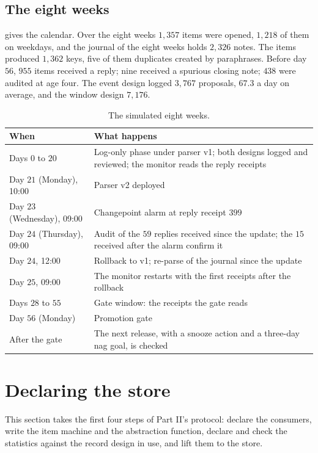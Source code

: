 \documentclass[11pt]{article}
\theoremstyle{definition}
\theoremstyle{plain}
\begin{document}
\subsection{The eight weeks}\label{sec:weeks}

 gives the calendar. Over the eight weeks $1{,}357$ items were opened, $1{,}218$
of them on weekdays, and the journal of the eight weeks holds $2{,}326$ notes. The items produced
$1{,}362$ keys, five of them duplicates created by paraphrases. Before day~$56$, $955$ items received
a reply; nine received a spurious closing note; $438$ were audited at age four. The event design
logged $3{,}767$ proposals, $67.3$ a day on average, and the window design $7{,}176$.

\begin{table}[ht]
\centering\small
\begin{tabularx}{\textwidth}{>{\raggedright\arraybackslash}p{3.4cm}X}
\toprule
When & What happens\\
\midrule
Days $0$ to $20$ & Log-only phase under parser v1; both designs logged and reviewed; the
monitor reads the reply receipts\\
Day $21$ (Monday), 10:00 & Parser v2 deployed\\
Day $23$ (Wednesday), 09:00 & Changepoint alarm at reply receipt $399$\\
Day $24$ (Thursday), 09:00 & Audit of the $59$ replies received since the update; the $15$
received after the alarm confirm it\\
Day $24$, 12:00 & Rollback to v1; re-parse of the journal since the update\\
Day $25$, 09:00 & The monitor restarts with the first receipts after the rollback\\
Days $28$ to $55$ & Gate window: the receipts the gate reads\\
Day $56$ (Monday) & Promotion gate\\
After the gate & The next release, with a snooze action and a three-day nag goal, is
checked\\
\bottomrule
\end{tabularx}
\caption{The simulated eight weeks.}\label{tab:timeline}
\end{table}
\section{Declaring the store}\label{sec:declare}

This section takes the first four steps of Part II's protocol: declare the consumers, write the item
machine and the abstraction function, declare and check the statistics against the record design
in use, and lift them to the store.
\end{document}
